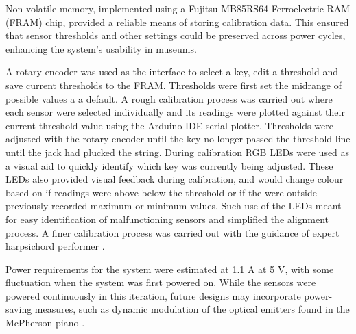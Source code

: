 Non-volatile memory, implemented using a Fujitsu MB85RS64 Ferroelectric RAM (FRAM) chip, provided a reliable means of storing calibration data. This ensured that sensor thresholds and other settings could be preserved across power cycles, enhancing the system's usability in museums.


A rotary encoder was used as the interface to select a key, edit a threshold and save current thresholds to the FRAM.
Thresholds were first set the midrange of possible values a a default. A rough calibration process was carried out where each sensor were selected individually and its readings were plotted against their current threshold value using the Arduino IDE serial plotter. Thresholds were adjusted with the rotary encoder until the key no longer passed the threshold line until the jack had plucked the string. During calibration RGB LEDs were used as a visual aid to quickly identify which key was currently being adjusted. These LEDs also provided visual feedback during calibration, and would change colour based on if readings were above below the threshold or if the were outside previously recorded maximum or minimum values. Such use of the LEDs meant for easy identification of malfunctioning sensors and simplified the alignment process. A finer calibration process was carried out with the guidance of expert harpsichord performer .

Power requirements for the system were estimated at 1.1 A at 5 V, with some fluctuation when the system was first powered on. While the sensors were powered continuously in this iteration, future designs may incorporate power-saving measures, such as dynamic modulation of the optical emitters found in the McPherson piano \cite{McPherson2013}.


